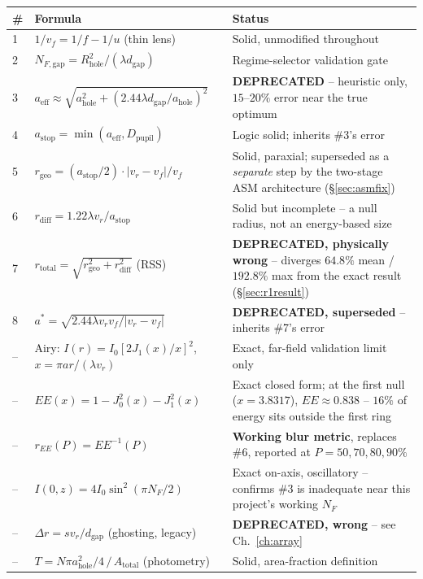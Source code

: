 \documentclass[11pt]{report}
\newcommand{\ahole}{a_{\text{hole}}}
\newcommand{\aeff}{a_{\text{eff}}}
\newcommand{\astop}{a_{\text{stop}}}
\newcommand{\dgap}{d_{\text{gap}}}
\newcommand{\vr}{v_r}
\newcommand{\vf}{v_f}
\newcommand{\rgeo}{r_{\text{geo}}}
\newcommand{\rdiff}{r_{\text{diff}}}
\newcommand{\rtotal}{r_{\text{total}}}
\newcommand{\Dpupil}{D_{\text{pupil}}}
\begin{document}
\begin{longtable}{p{1.4cm}p{7.3cm}p{5.0cm}}
\toprule
\textbf{\#} & \textbf{Formula} & \textbf{Status} \\
\midrule
\endhead
1 & $1/\vf = 1/f - 1/u$ (thin lens) & Solid, unmodified throughout \\
2 & $N_{F,\text{gap}} = R_{\text{hole}}^2/(\lambda\dgap)$ & Regime-selector validation gate \\
3 & $\aeff\approx\sqrt{\ahole^2+(2.44\lambda\dgap/\ahole)^2}$ &
\textbf{DEPRECATED} -- heuristic only, $15$--$20\%$ error near the true optimum \\
4 & $\astop=\min(\aeff,\Dpupil)$ & Logic solid; inherits \#3's error \\
5 & $\rgeo=(\astop/2)\cdot|\vr-\vf|/\vf$ & Solid, paraxial; superseded as a
\emph{separate} step by the two-stage ASM architecture (\S\ref{sec:asmfix}) \\
6 & $\rdiff=1.22\lambda\vr/\astop$ & Solid but incomplete -- a null radius, not an
energy-based size \\
7 & $\rtotal=\sqrt{\rgeo^2+\rdiff^2}$ (RSS) & \textbf{DEPRECATED, physically wrong} --
diverges $64.8\%$ mean / $192.8\%$ max from the exact result (\S\ref{sec:r1result}) \\
8 & $a^*=\sqrt{2.44\lambda\vr\vf/|\vr-\vf|}$ & \textbf{DEPRECATED, superseded} -- inherits
\#7's error \\
-- & Airy: $I(r)=I_0[2J_1(x)/x]^2$, $x=\pi ar/(\lambda\vr)$ & Exact, far-field validation
limit only \\
-- & $EE(x)=1-J_0^2(x)-J_1^2(x)$ & Exact closed form; at the first null ($x{=}3.8317$),
$EE\approx0.838$ -- $16\%$ of energy sits outside the first ring \\
-- & $r_{EE}(P)=EE^{-1}(P)$ & \textbf{Working blur metric}, replaces \#6, reported at
$P{=}50,70,80,90\%$ \\
-- & $I(0,z)=4I_0\sin^2(\pi N_F/2)$ & Exact on-axis, oscillatory -- confirms \#3 is
inadequate near this project's working $N_F$ \\
-- & $\Delta r=s\vr/\dgap$ (ghosting, legacy) & \textbf{DEPRECATED, wrong} -- see
Ch.~\ref{ch:array} \\
-- & $T=N\pi\ahole^2/4\,/\,A_{\text{total}}$ (photometry) & Solid, area-fraction definition \\
\bottomrule
\end{longtable}
\end{document}
